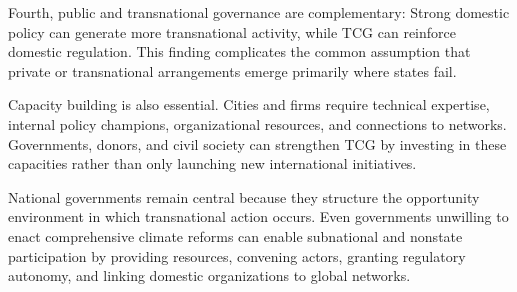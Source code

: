 Fourth, public and transnational governance are  complementary: Strong domestic policy can generate more transnational activity, while TCG can reinforce domestic regulation. This finding complicates the common assumption that private or transnational arrangements emerge primarily where states fail.

Capacity building is also essential. Cities and firms require technical expertise, internal policy champions, organizational resources, and connections to networks. Governments, donors, and civil society can strengthen TCG by investing in these capacities rather than only launching new international initiatives.

National governments remain central because they structure the opportunity environment in which transnational action occurs. Even governments unwilling to enact comprehensive climate reforms can enable subnational and nonstate participation by providing resources, convening actors, granting regulatory autonomy, and linking domestic organizations to global networks.






